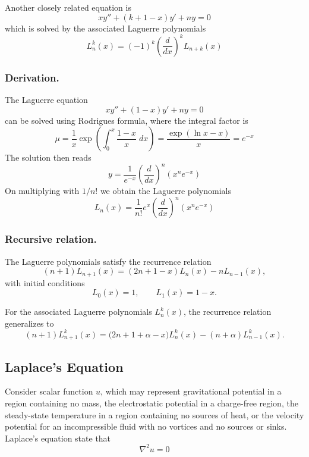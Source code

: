 \documentclass[../../../main.tex]{subfiles}
\begin{document}
Another closely related equation is 
\begin{equation*}
    xy''+(k+1-x)y'+ny=0
\end{equation*}
which is solved by the associated Laguerre polynomials
\begin{equation*}
    L_n^k(x)=(-1)^k\left(\frac{d}{dx}\right)^kL_{n+k}(x)
\end{equation*}

\subsubsection{Derivation.} 
The Laguerre equation
\begin{equation*}
    xy''+(1-x)y'+ny=0
\end{equation*}
can be solved using Rodrigues formula, where the integral factor is 
\begin{equation*}
    \mu=\frac{1}{x}\exp\left(\int_{0}^{x}\frac{1-x}{x}\;dx\right)=\frac{\exp(\ln x-x )}{x}=e^{-x}
\end{equation*}
The solution then reads
\begin{equation*}
    y=\frac{1}{e^{-x}}\left(\frac{d}{dx}\right)^n\left(x^ne^{-x}\right)
\end{equation*}
On multiplying with $1/n!$ we obtain the Laguerre polynomials
\begin{equation*}
    L_n(x)=\frac{1}{n!}e^x\left(\frac{d}{dx}\right)^n(x^ne^{-x})
\end{equation*}

\subsubsection{Recursive relation.}
The Laguerre polynomials satisfy the recurrence relation
\begin{equation*}
(n+1)L_{n+1}(x) = (2n+1 - x)L_n(x) - nL_{n-1}(x),
\end{equation*}
with initial conditions
\begin{equation*}
L_0(x) = 1, \qquad L_1(x) = 1 - x.
\end{equation*}

For the associated Laguerre polynomials $L_n^k(x)$, the recurrence relation generalizes to
\begin{equation*}
(n+1)L_{n+1}^k(x) = \big(2n+1+\alpha - x\big)L_n^k(x) - (n+\alpha)L_{n-1}^k(x).
\end{equation*}


\subsection{Laplace's Equation}
Consider scalar function $u$, which may represent gravitational potential in a region containing no mass, the electrostatic potential in a charge-free region, the steady-state temperature in a region containing no sources of heat, or the velocity potential for an incompressible fluid with no vortices and no sources or sinks.
Laplace's equation state that
\begin{equation*}
    \nabla^2 u=0
\end{equation*}
\end{document}
